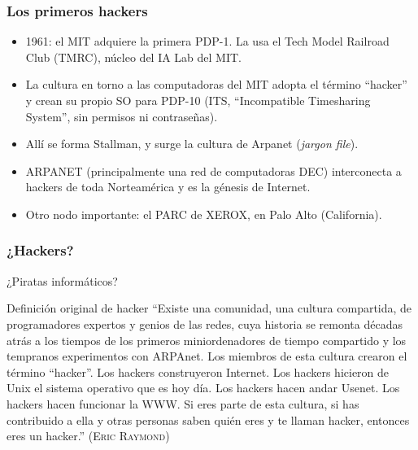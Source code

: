 \documentclass{beamer}
\begin{document}
\begin{frame}
\frametitle{Los primeros hackers}

\begin{itemize}

\item 1961: el MIT adquiere la primera PDP-1. La usa el Tech Model Railroad Club (TMRC), núcleo del IA Lab del MIT. 
\item La cultura en torno a las computadoras del MIT adopta el término ``hacker'' y crean su propio SO para PDP-10 (ITS, ``Incompatible Timesharing System'', sin permisos ni contraseñas).
\item Allí se forma Stallman, y surge la cultura de Arpanet (\textit{jargon file}).
\item ARPANET (principalmente una red de computadoras DEC) interconecta a hackers de toda Norteamérica y es la génesis de Internet.
\item Otro nodo importante: el PARC de XEROX, en Palo Alto (California). 

\end{itemize}

\end{frame}



\begin{frame}
\frametitle{¿Hackers?}

¿Piratas informáticos?

\pause

\begin{block}{Definición original de hacker}
\footnotesize{``Existe una comunidad, una cultura compartida, de programadores expertos y genios de las redes, cuya historia se remonta décadas atrás a los tiempos de los primeros miniordenadores de tiempo compartido y los tempranos experimentos con ARPAnet. Los miembros de esta cultura crearon el término ``hacker''. Los hackers construyeron Internet. Los hackers hicieron de Unix el sistema operativo que es hoy día. Los hackers hacen andar Usenet. Los hackers hacen funcionar la WWW. Si eres parte de esta cultura, si has contribuido a ella y otras personas saben quién eres y te llaman hacker, entonces eres un hacker.'' (\textsc{Eric Raymond})}
\end{block}

\end{frame}


\end{document}
